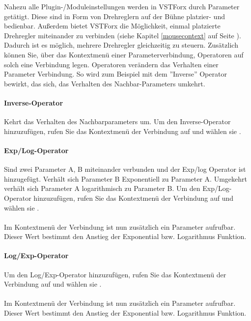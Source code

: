 Nahezu alle Plugin-/Moduleinstellungen werden in VSTForx durch Parameter getätigt. Diese sind in Form von Drehreglern auf der Bühne platzier- und bedienbar. Außerdem bietet VSTForx die Möglichkeit, einmal platzierte Drehregler miteinander zu verbinden (siehe Kapitel \ref{mousecontext} auf Seite \pageref{mousecontext}).
Dadurch ist es möglich, mehrere Drehregler gleichzeitig zu steuern. 
Zusätzlich können Sie, über das Kontextmenü einer Parameterverbindung, Operatoren auf solch eine Verbindung legen. Operatoren verändern das Verhalten einer Parameter Verbindung. So wird zum Beispiel mit dem ''Inverse'' Operator bewirkt, das sich, das Verhalten des Nachbar-Parameters umkehrt. 

\paragraph{Inverse-Operator}
Kehrt das Verhalten des Nachbarparameters um. Um den Inverse-Operator hinzuzufügen, rufen Sie das Kontextmenü der Verbindung auf und wählen sie .

\paragraph{Exp/Log-Operator}
Sind zwei Parameter A, B miteinander verbunden und der Exp/log Operator ist hinzugefügt. Verhält sich Parameter B Exponentiell zu Parameter A. Umgekehrt verhält sich Parameter A logarithmisch zu Parameter B.
Um den Exp/Log-Operator hinzuzufügen, rufen Sie das Kontextmenü der Verbindung auf und wählen sie .
\\\\
Im Kontextmenü der Verbindung ist nun zusätzlich ein  Parameter aufrufbar. Dieser Wert bestimmt den Anstieg der Exponential bzw. Logarithmus Funktion.

\paragraph{Log/Exp-Operator}
Um den Log/Exp-Operator hinzuzufügen, rufen Sie das Kontextmenü der Verbindung auf und wählen sie .
\\\\
Im Kontextmenü der Verbindung ist nun zusätzlich ein  Parameter aufrufbar. Dieser Wert bestimmt den Anstieg der Exponential bzw. Logarithmus Funktion.

